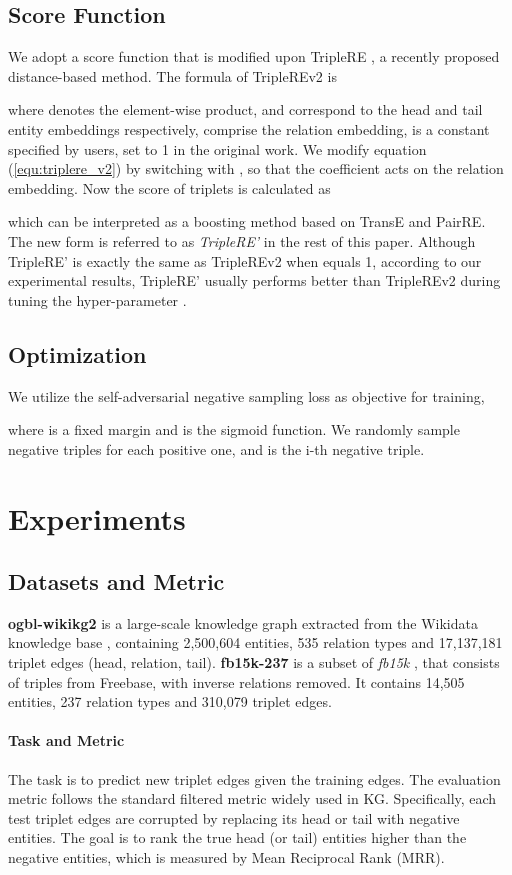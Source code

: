 \documentclass{article}
\begin{document}
\subsection{Score Function}
We adopt a score function that is modified upon TripleRE \cite{yu2021triplere}, a recently proposed distance-based method. The formula of TripleREv2 is

where  denotes the element-wise product,  and  correspond to the head and tail entity embeddings respectively,  comprise the relation embedding,  is a constant specified by users, set to 1 in the original work.
We modify equation (\ref{equ:triplere_v2}) by switching  with , so that the coefficient  acts on the relation embedding.
Now the score of triplets  is calculated as

which can be interpreted as a boosting method based on TransE and PairRE. The new form is referred to as \emph{TripleRE'} in the rest of this paper. Although TripleRE' is exactly the same as TripleREv2 when  equals 1, according to our experimental results, TripleRE' usually performs better than TripleREv2 during tuning the hyper-parameter .

\subsection{Optimization}
We utilize the self-adversarial negative sampling loss \cite{sun2018rotate} as objective for training,

where  is a fixed margin and  is the sigmoid function. We randomly sample  negative triples for each positive one, and  is the i-th negative triple.

\section{Experiments}
\subsection{Datasets and Metric}
\textbf{ogbl-wikikg2} \cite{hu2020open} is a large-scale knowledge graph extracted from the Wikidata knowledge base \cite{vrandevcic2014wikidata}, containing 2,500,604 entities, 535 relation types and 17,137,181 triplet edges (head, relation, tail). \textbf{fb15k-237} \cite{toutanova2015observed} is a subset of \emph{fb15k} \cite{bordes2013translating}, that consists of triples from Freebase, with inverse relations removed. It contains 14,505 entities, 237 relation types and 310,079 triplet edges.
\paragraph{Task and Metric} The task is to predict new triplet edges given the training edges. The evaluation metric follows the standard filtered metric widely used in KG. Specifically, each test triplet edges are corrupted by replacing its head or tail with negative entities. The goal is to rank the true head (or tail) entities higher than the negative entities, which is measured by Mean Reciprocal Rank (MRR).
\end{document}
